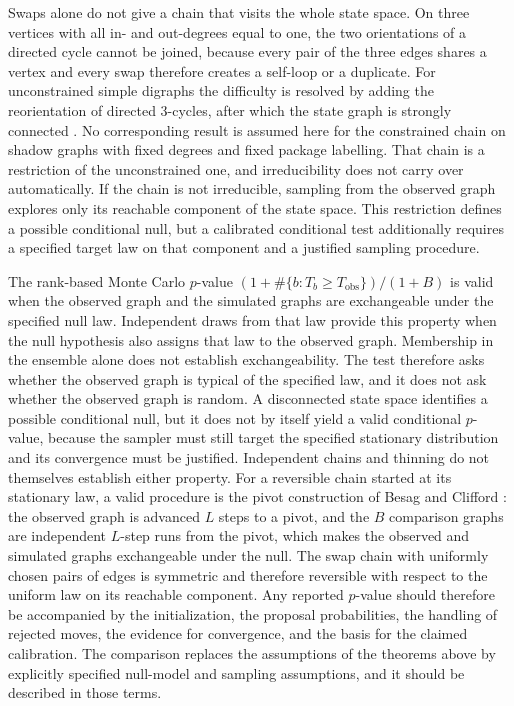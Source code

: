 \documentclass[11pt]{article}
\begin{document}
Swaps alone do not give a chain that visits the whole state space. On three vertices with all in- and out-degrees equal to one, the two orientations of a directed cycle cannot be joined, because every pair of the three edges shares a vertex and every swap therefore creates a self-loop or a duplicate. For unconstrained simple digraphs the difficulty is resolved by adding the reorientation of directed 3-cycles, after which the state graph is strongly connected \cite{RaoJanaBandyopadhyay1996,BergerMullerHannemann2010}. No corresponding result is assumed here for the constrained chain on shadow graphs with fixed degrees and fixed package labelling. That chain is a restriction of the unconstrained one, and irreducibility does not carry over automatically. If the chain is not irreducible, sampling from the observed graph explores only its reachable component of the state space. This restriction defines a possible conditional null, but a calibrated conditional test additionally requires a specified target law on that component and a justified sampling procedure.

The rank-based Monte Carlo $p$-value $(1+\#\{b:T_b\ge T_{\mathrm{obs}}\})/(1+B)$ is valid when the observed graph and the simulated graphs are exchangeable under the specified null law. Independent draws from that law provide this property when the null hypothesis also assigns that law to the observed graph. Membership in the ensemble alone does not establish exchangeability. The test therefore asks whether the observed graph is typical of the specified law, and it does not ask whether the observed graph is random. A disconnected state space identifies a possible conditional null, but it does not by itself yield a valid conditional $p$-value, because the sampler must still target the specified stationary distribution and its convergence must be justified. Independent chains and thinning do not themselves establish either property. For a reversible chain started at its stationary law, a valid procedure is the pivot construction of Besag and Clifford \cite{BesagClifford1989}: the observed graph is advanced $L$ steps to a pivot, and the $B$ comparison graphs are independent $L$-step runs from the pivot, which makes the observed and simulated graphs exchangeable under the null. The swap chain with uniformly chosen pairs of edges is symmetric and therefore reversible with respect to the uniform law on its reachable component. Any reported $p$-value should therefore be accompanied by the initialization, the proposal probabilities, the handling of rejected moves, the evidence for convergence, and the basis for the claimed calibration. The comparison replaces the assumptions of the theorems above by explicitly specified null-model and sampling assumptions, and it should be described in those terms.
\end{document}
